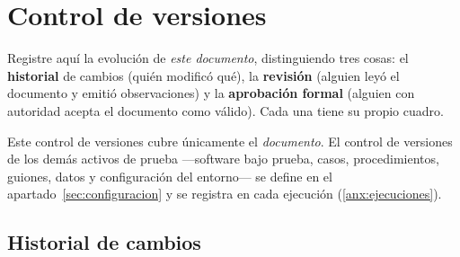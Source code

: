 \clearpage
\section*{Control de versiones}
{}

\begin{instruccion}
Registre aquí la evolución de \emph{este documento}, distinguiendo tres cosas: el
\textbf{historial} de cambios (quién modificó qué), la \textbf{revisión} (alguien leyó el
documento y emitió observaciones) y la \textbf{aprobación formal} (alguien con autoridad acepta
el documento como válido). Cada una tiene su propio cuadro.
\end{instruccion}

\begin{notanormativa}
Este control de versiones cubre únicamente el \emph{documento}. El control de versiones de los
demás activos de prueba —software bajo prueba, casos, procedimientos, guiones, datos y
configuración del entorno— se define en el apartado~\ref{sec:configuracion} y se registra en
cada ejecución (\ref{anx:ejecuciones}).
\end{notanormativa}

\begin{observacion}
\end{observacion}

\subsection*{Historial de cambios}

